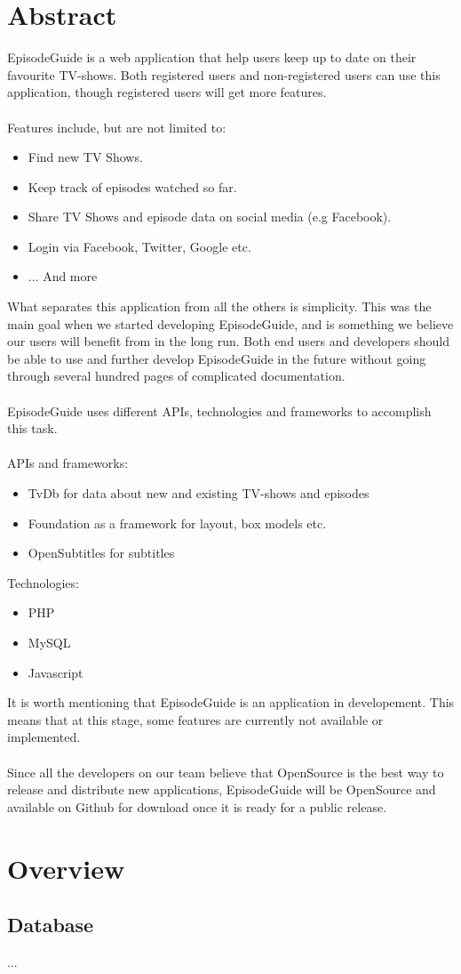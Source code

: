 \documentclass[12pt]{article}
\begin{document}


\tableofcontents

\section{Abstract}
EpisodeGuide is a web application that help users keep up to date on their favourite TV-shows. Both registered users and non-registered users can use this application, though registered users will get more features.
\\\\
Features include, but are not limited to:
\begin{itemize}
  \item Find new TV Shows.
  \item Keep track of episodes watched so far.
  \item Share TV Shows and episode data on social media (e.g Facebook).
  \item Login via Facebook, Twitter, Google etc.
  \item ... And more
\end{itemize}
What separates this application from all the others is simplicity. This was the main goal when we started developing EpisodeGuide, and is something we believe our users will benefit from in the long run.
Both end users and developers should be able to use and further develop EpisodeGuide in the future without going through several hundred pages of complicated documentation.
\\\\
EpisodeGuide uses different APIs, technologies and frameworks to accomplish this task.\\\\
APIs and frameworks:
\begin{itemize}
  \item TvDb for data about new and existing TV-shows and episodes
  \item Foundation as a framework for layout, box models etc.
  \item OpenSubtitles for subtitles
\end{itemize}
Technologies:
\begin{itemize}
  \item PHP
  \item MySQL
  \item Javascript
\end{itemize}
It is worth mentioning that EpisodeGuide is an application in developement. This means that at this stage, some features are currently not available or implemented.\\
\\
Since all the developers on our team believe that OpenSource is the best way to release and distribute new applications, EpisodeGuide will be OpenSource and available on Github for download once it is ready for a public release.
\section{Overview}
\subsection{Database}




...
\end{document}
